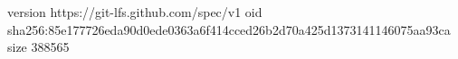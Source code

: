 version https://git-lfs.github.com/spec/v1
oid sha256:85e177726eda90d0ede0363a6f414cced26b2d70a425d1373141146075aa93ca
size 388565
